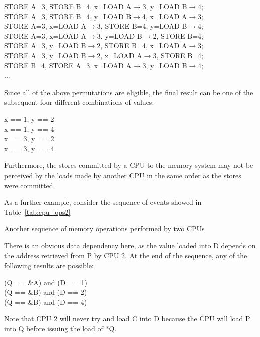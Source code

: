 \begin{center}
STORE A=3, STORE B=4, x=LOAD A$\rightarrow$3, y=LOAD B$\rightarrow$4;\\
STORE A=3, STORE B=4, y=LOAD B$\rightarrow$4, x=LOAD A$\rightarrow$3;\\
STORE A=3, x=LOAD A$\rightarrow$3, STORE B=4, y=LOAD B$\rightarrow$4;\\
STORE A=3, x=LOAD A$\rightarrow$3, y=LOAD B$\rightarrow$2, STORE B=4;\\
STORE A=3, y=LOAD B$\rightarrow$2, STORE B=4, x=LOAD A$\rightarrow$3;\\
STORE A=3, y=LOAD B$\rightarrow$2, x=LOAD A$\rightarrow$3, STORE B=4;\\
STORE B=4, STORE A=3, x=LOAD A$\rightarrow$3, y=LOAD B$\rightarrow$4;\\
...
\end{center}

Since all of the above permutations are eligible, the final result can be one of the
subsequent four different combinations of values:

\begin{center}
x == 1, y == 2\\
x == 1, y == 4\\
x == 3, y == 2\\
x == 3, y == 4
\end{center}

Furthermore, the stores committed by a CPU to the memory system may not be perceived
by the loads made by another CPU in the same order as the stores were committed.

As a further example, consider the sequence of events showed in Table~\ref{tab:cpu_ops2}

\begin{table}[htb]

\caption{Another sequence of memory operations performed by two CPUs}
\label{tab:cpu_ops2}
\end{table}

There is an obvious data dependency here, as the value loaded into D depends on the
address retrieved from P by CPU 2. At the end of the sequence, any of the following
results are possible:

\begin{center}
(Q == \&A) and (D == 1)\\
(Q == \&B) and (D == 2)\\
(Q == \&B) and (D == 4)
\end{center}

Note that CPU 2 will never try and load C into D because the CPU will load P into Q
before issuing the load of *Q.


